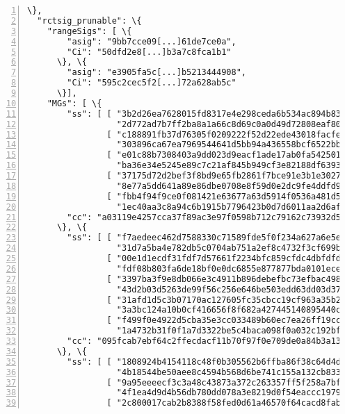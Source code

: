\begin{appendices}
\begin{Verbatim}[commandchars=\\\{\}, numbers=left]
  \}, 
  "rctsig_prunable": \{
    "rangeSigs": [ \{
        "asig": "9bb7cce09[...]61de7ce0a", 
        "Ci": "50dfd2e8[...]b3a7c8fca1b1"
      \}, \{
        "asig": "e3905fa5c[...]b5213444908", 
        "Ci": "595c2cec5f2[...]72a628ab5c"
      \}], 
    "MGs": [ \{
        "ss": [ [ "3b2d26ea7628015fd8317e4e298ceda6b534ac894b83f7b6190a353cee6ec702", 
                  "2d772ad7b7ff2ba8a1a66c8d69c0a0d49d72808eaf803c59f13c3d78b653440c"], 
                [ "c188891fb37d76305f0209222f52d22ede43018facfe91f949ecb8dcf709b30a", 
                  "303896ca67ea7969544641d5bb94a436558bcf6522bb9bc77bd1abb5f2146c08"], 
                [ "e01c88b7308403a9dd023d9eacf1ade17ab0fa54250148431b5a33c98e636100", 
                  "ba36e34e5245e89c7c21af845b949cf3e82188df639390f094e31c9ba773060c"], 
                [ "37175d72d2bef3f8bd9e65fb2861f7bce91e3b1e30278b2dcf26112831ac9405", 
                  "8e77a5dd641a89e86dbe0708e8f59d0e2dc9fe4ddfd9b367c3a93522198a4706"], 
                [ "fbb4f94f9ce0f081421e63677a63d5914f0536a481d57b6e5fc5379c84dfcb05", 
                  "1ec40aa3c8a94c6b1915b7796423b0d7d6011aa2d6af636aff309b832f193408"]], 
        "cc": "a03119e4257cca37f89ac3e97f0598b712c79162c73932d58ab4ce08c4ad6709"
      \}, \{
        "ss": [ [ "f7aedeec462d7588330c71589fde5f0f234a627a6e5ed72cff34825a04d41707", 
                  "31d7a5ba4e782db5c0704ab751a2ef8c4732f3cf699bc8f9994e79a97cd3190e"], 
                [ "00e1d1ecdf31fdf7d57661f2234bfc859cfdc4dbfdfd0f5eec0576ef22592203", 
                  "fdf08b803fa6de18bf0e0dc6855e877877bda0101eceb81e2223fe0175606300"], 
                [ "3397ba3f9e8db066e3c4911b896debefbc73efbac4988e6aff5731ff8db15405", 
                  "43d2b03d5263de99f56c256e646be503edd63dd03d377a469379fbf487e8600e"], 
                [ "31afd1d5c3b07170ac127605fc35cbcc19cf963a35b2ff8f804e17e3b804000d", 
                  "3a3bc124a10b0cf416656f8f682a427445140895440cca644c6aa38966399f0c"], 
                [ "f499f0e4922d5cba35e3cc033489b60ec7ea26ff19cc9dd29357670f4bf8790b", 
                  "1a4732b31f0f1a7d3322be5c4baca098f0a032c192bf9f8a6b5fd83cbdd9d401"]], 
        "cc": "095fcab7ebf64c2ffecdacf11b70f97f0e709de0a84b3a13abca627f9df2c901"
      \}, \{
        "ss": [ [ "1808924b4154118c48f0b305562b6ffba86f38c64d4d8a087823f3383cddd006", 
                  "4b18544be50aee8c4594b568d6be741c155a132cb83392d9b1a4cf35c3d5760c"], 
                [ "9a95eeeecf3c3a48c43873a372c263357ff5f258a7bf8ed29a767237b0b0f202", 
                  "4f1ea4d9d4b56db780dd078a3e8219d0f54eaccc197901671002a206f063cb0e"], 
                [ "2c800017cab2b8388f58fed0d61a46570f64cacd8fabc4e84ddee735b3135f0a", 

\end{Verbatim}
\end{appendices}
